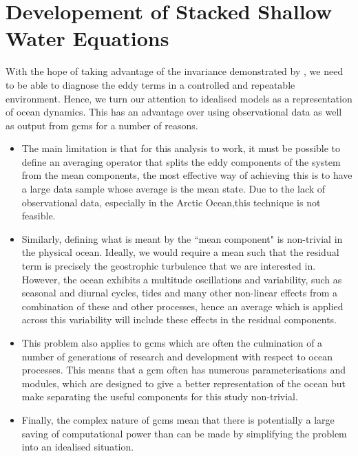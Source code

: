 \documentclass[12pt,a4paper]{report}
\begin{document}
\chapter{Developement of Stacked Shallow Water Equations}
\label{sweq}

With the hope of taking advantage of the invariance demonstrated by 
\cite{maddison2013eliassen}, we need to be able to diagnose the
eddy terms in a controlled and repeatable environment. Hence, we turn our attention to
idealised models as a representation of ocean dynamics. This has an advantage 
over using observational data as well as output from \glspl{gcm} for a number of reasons.
\begin{itemize}
	\item The main limitation is that for this analysis to work, it must be possible to define an
	averaging operator that splits the eddy components of the system from the mean
	components, the most effective way of achieving this is to have a large data sample
	whose average is the mean state. Due to the lack of observational data, especially in the
	Arctic Ocean,this  technique is not feasible.
	\item Similarly, defining what is meant by the ``mean component" is non-trivial in the physical ocean. Ideally, we would require a mean such that the residual term is precisely the 
	geostrophic turbulence that we are interested in. However, the ocean exhibits a multitude 
	oscillations and variability, such as seasonal and diurnal cycles, tides and many other
	non-linear effects from a combination of these and other processes, hence an average which
	is applied across this variability will include these effects in the residual components.
	\item This problem also applies to \glspl{gcm} which are often the culmination of 
	a number of generations of research and development with respect to ocean processes.
	This means that a \gls{gcm} often has numerous parameterisations and modules, which are
	designed to give a better representation of the ocean but make separating the useful components
	for this study non-trivial. 
	\item Finally, the complex nature of \glspl{gcm} mean that there is potentially a large saving
	of computational power than can be made by simplifying the problem into an idealised situation.
\end{itemize}
\end{document}
